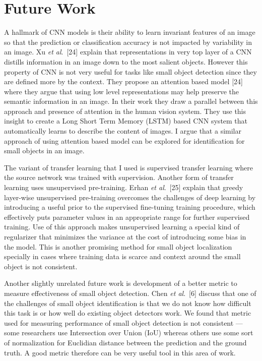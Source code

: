 \documentclass [11pt,letterpaper ,twoside ,openany ]{report}
\begin{document}
    \chapter{Future Work}
    \doublespacing
    A hallmark of CNN models is their ability to learn invariant features of an image so that the prediction or classification accuracy is not impacted by variability in an image. Xu \textit {et al}.\ [24] explain that representations in very top layer of a CNN distills information in an image down to the most salient objects. However this property of CNN is not very useful for tasks like small object detection since they are defined more by the context. They propose an attention based model [24] where they argue that using low level representations may help preserve the semantic information in an image. In their work they draw a parallel between this approach and presence of attention in the human vision system. They use this insight to create a Long Short Term Memory (LSTM) based CNN system that automatically learns to describe the content of images. I argue that a similar approach of using attention based model can be explored for identification for small objects in an image.

    The variant of transfer learning that I used is supervised transfer learning where the source network was trained with supervision. Another form of transfer learning uses unsupervised pre-training. Erhan \textit {et al}.\ [25] explain that greedy layer-wise unsupervised pre-training overcomes the challenges of deep learning by introducing a useful prior to the supervised fine-tuning training procedure, which effectively puts parameter values in an appropriate range for further supervised training. Use of this approach makes unsupervised learning a special kind of regularizer that minimizes the variance at the cost of introducing some bias in the model. This is another promising method for small object localization specially in cases where training data is scarce and context around the small object is not consistent.

    Another slightly unrelated future work is development of a better metric to measure effectiveness of small object detection. Chen \textit {et al}.\ [6] discuss that one of the challenges of small object identification is that we do not know how difficult this task is or how well do existing object detectors work. We found that metric used for measuring performance of small object detection is not consistent --- some researchers use Intersection over Union (IoU) whereas others use some sort of normalization for Euclidian distance between the prediction and the ground truth. A good metric therefore can be very useful tool in this area of work.
\end{document}
